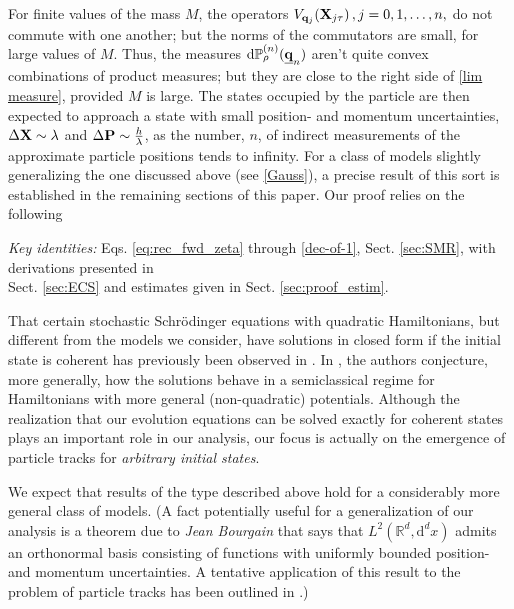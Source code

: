 \documentclass[12pt]{article}
\renewcommand{\d}{{\mathrm d}}
\begin{document}
 For finite values of the mass $M$, the operators  $V_{{\bf{q}}_{j}}({\bf{X}}_{j \tau})\,, j= 0,1,\dots, n,$ do not commute with one another; but the norms of the commutators are small, for large values of $M$. Thus, the measures 
 $\d\mathbb{P}^{(n)}_{\rho}(\underline{{\bf{q}}}_{n})$ aren't quite convex combinations of 
 product measures; but they are close to the right side of \eqref{lim measure}, provided $M$ is large. 
 The states occupied by the particle are then expected to approach a state with small
position- and momentum uncertainties, $\Delta {\bf{X}} \sim \lambda$ and $\Delta {\bf{P}} \sim \frac{h}{\lambda}$, 
as the number, $n$, of indirect measurements of the approximate particle positions tends to infinity. 
For a class of models slightly generalizing the one discussed above (see \eqref{Gauss}), 
a precise result of this sort is established in the remaining sections of this paper. Our proof relies on the following
\begin{center} 
\textit{Key identities:} Eqs. \eqref{eq:rec_fwd_zeta} through \eqref{dec-of-1}, Sect. \ref{sec:SMR}, with derivations 
presented in\\ Sect. \ref{sec:ECS} and estimates given in Sect. \ref{sec:proof_estim}. 
\end{center}
That certain stochastic Schr\"{o}dinger equations with quadratic Hamiltonians, but different from the models we consider, have solutions in closed form if the initial state is coherent has previously been observed in \cite{BK, BDK, BBJ}. In \cite{BBJ}, the authors conjecture, more generally, how the solutions behave in a semiclassical regime for Hamiltonians with more general (non-quadratic) potentials. Although the realization that our evolution equations can be solved exactly for coherent states  plays an important role in our analysis, our focus is actually on the emergence of particle tracks for \textit{arbitrary initial states}.

We expect that results of the type described above hold for a considerably more general class of models. 
(A fact potentially useful for a generalization of our analysis is a theorem due to \textit{Jean Bourgain} \cite{Bourgain} 
that says that $L^{2}(\mathbb{R}^{d}, \d^{d}x)$ admits an orthonormal basis consisting of functions with uniformly 
bounded position- and momentum uncertainties.  A tentative application of this result to the problem of particle 
tracks has been outlined in \cite{BFF}.)
\end{document}
